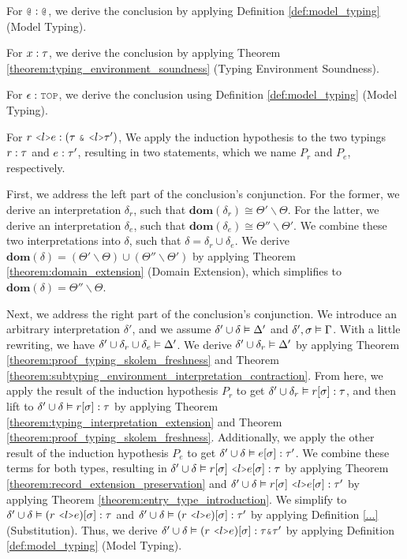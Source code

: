 \documentclass[acmsmall]{acmart}
\theoremstyle{definition}
\begin{document}
\pc
For $\J{@} \hastype \J{@}$,
we derive the conclusion by applying Definition \ref{def:model_typing} (Model Typing).

\pc
For $ x : \tau$, 
we derive the conclusion by applying Theorem \ref{theorem:typing_environment_soundness}
(Typing Environment Soundness).

\pc
For $\epsilon \hastype \J{TOP}$,
we derive the conclusion using Definition \ref{def:model_typing} (Model Typing).

\pc
For $r\ \J{<}l \J{>} e \hastype (\tau\ \J{\&}\ \J{<} l \J{>} \tau')$,
We apply the induction hypothesis to the two typings 
$r : \tau$ and $e : \tau'$, 
resulting in two statements, which we name $P_r$ and $P_e$, respectively. 

\noindent
First, we address the left part of the conclusion's conjunction. 
For the former, we derive
an interpretation $\delta_r$, such that $\textbf{dom}(\delta_r) \cong \Theta' \backslash \Theta$.
For the latter, we derive an interpretation $\delta_e$, 
such that $\textbf{dom}(\delta_e) \cong \Theta'' \backslash \Theta'$.
We combine these two interpretations into $\delta$,
such that $\delta = \delta_r \cup \delta_e$.
We derive $\textbf{dom}(\delta) = (\Theta' \backslash \Theta) \cup (\Theta'' \backslash \Theta')$
by applying Theorem \ref{theorem:domain_extension} (Domain Extension),
which simplifies to  $\textbf{dom}(\delta) = \Theta'' \backslash \Theta$.

\noindent
Next, we address the right part of the conclusion's conjunction. 
We introduce an arbitrary interpretation $\delta'$, and we assume
$\delta' \cup \delta \vDash \Delta'$ and $\delta', \sigma \vDash \Gamma$.
With a little rewriting, we have $\delta' \cup \delta_r \cup \delta_e \vDash \Delta'$.
We derive $\delta' \cup \delta_r \vDash \Delta'$ by 
applying Theorem \ref{theorem:proof_typing_skolem_freshness} 
and Theorem \ref{theorem:subtyping_environment_interpretation_contraction}. 
From here, we apply the result of the induction hypothesis $P_r$ to get 
$\delta' \cup \delta_r \vDash r[\sigma] : \tau$,
and then lift to $\delta' \cup \delta \vDash r[\sigma] : \tau$ 
by applying Theorem \ref{theorem:typing_interpretation_extension} and Theorem \ref{theorem:proof_typing_skolem_freshness}.
Additionally, we apply the other result of the induction hypothesis $P_e$ to get
$\delta' \cup \delta \vDash e[\sigma] : \tau'$.
We combine these terms for both types, resulting
in $\delta' \cup \delta \satisfies r[\sigma]\ \J{<}l\J{>} e[\sigma] \hastype \tau$
by applying Theorem \ref{theorem:record_extension_preservation}
and $\delta' \cup \delta \satisfies r[\sigma]\ \J{<}l\J{>} e[\sigma] \hastype \tau'$
by applying Theorem \ref{theorem:entry_type_introduction}.
We simplify to 
$\delta' \cup \delta \satisfies (r\ \J{<}l\J{>} e)[\sigma] \hastype \tau$
and $\delta' \cup \delta \satisfies (r\ \J{<}l\J{>} e)[\sigma] \hastype \tau'$
by applying Definition \ref{...} (Substitution).
Thus, we derive 
$\delta' \cup \delta \satisfies (r\ \J{<}l\J{>} e)[\sigma] \hastype \tau \J{\&} \tau'$
by applying Definition \ref{def:model_typing} (Model Typing).
\end{document}
